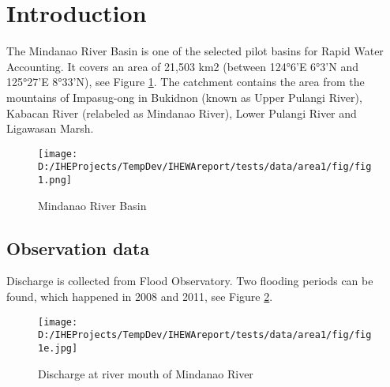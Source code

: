 \documentclass{article}%
\begin{document}
%
\normalsize%
\newpage%
\pagestyle{TOCPage}%
\cleardoublepage%
\clearpage%
%
\setcounter{page}{1}%
\pagestyle{PreambleHeader}%
\newpage%
\listoffigures%
%
\cleardoublepage%
\newpage%
\listoftables%
%
\cleardoublepage%
\clearpage%
%
\setcounter{page}{1}%
\pagestyle{SectionHeader}%
\newpage%
\RaggedRight%
\section{Introduction}%
\label{sec:Introduction}%
The Mindanao River Basin is one of the selected pilot basins for Rapid Water Accounting. It covers an area of 21,503 km2 (between 124°6’E 6°3’N and 125°27’E 8°33’N), see Figure \ref{figure:fig1}.%
\linebreak%
The catchment contains the area from the mountains of Impasug-ong in Bukidnon (known as Upper Pulangi River), Kabacan River (relabeled as Mindanao River), Lower Pulangi River and Ligawasan Marsh.%
\linebreak%


\begin{figure}[H]%
\centering%
\texttt{[image: D:/IHEProjects/TempDev/IHEWAreport/tests/data/area1/fig/fig1.png]}%
\caption{Mindanao River Basin}%
\label{figure:fig1}%
\end{figure}

%
\subsection{Observation data}%
\label{subsec:Observationdata}%
Discharge is collected from Flood Observatory. Two flooding periods can be found, which happened in 2008 and 2011, see Figure \ref{figure:fig2}.%
\linebreak%


\begin{figure}[H]%
\centering%
\texttt{[image: D:/IHEProjects/TempDev/IHEWAreport/tests/data/area1/fig/fig1e.jpg]}%
\caption{Discharge at river mouth of Mindanao River}%
\label{figure:fig2}%
\end{figure}

%
\RaggedRight%
\end{document}
